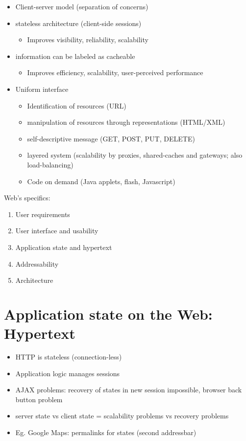\documentclass[a4paper]{report}
\begin{document}
\begin{itemize}
  \item Client-server model (separation of concerns)
  \item stateless architecture (client-side sessions)
    \begin{itemize}
      \item Improves visibility, reliability, scalability
    \end{itemize}
  \item information can be labeled as cacheable
    \begin{itemize}
      \item Improves efficiency, scalability, user-perceived performance
    \end{itemize}
  \item Uniform interface
    \begin{itemize}
      \item Identification of resources (URL)
      \item manipulation of resources through representations (HTML/XML)
      \item self-descriptive message (GET, POST, PUT, DELETE)
      \item layered system (scalability by proxies, shared-caches and
            gateways; also load-balancing)
      \item Code on demand (Java applets, flash, Javascript)
    \end{itemize}
\end{itemize}

Web's specifics:

\begin{enumerate}
  \item User requirements
  \item User interface and usability
  \item Application state and hypertext
  \item Addressability
  \item Architecture
\end{enumerate}

\section{Application state on the Web: Hypertext}

\begin{itemize}
  \item HTTP is stateless (connection-less)
  \item Application logic manages sessions
  \item AJAX problems: recovery of states in new session impossible, browser
            back button problem
  \item server state vs client state = scalability problems vs recovery
            problems
  \item Eg. Google Maps: permalinks for states (second addressbar)
\end{itemize}
\end{document}

